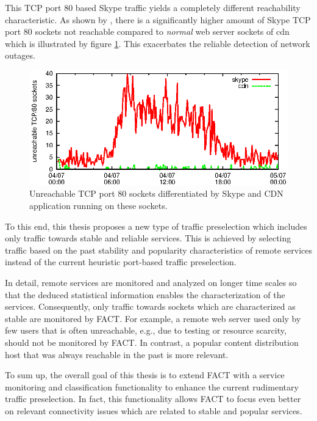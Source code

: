 This \gls{TCP} port 80 based Skype traffic yields a completely different reachability characteristic. As shown by \citet{SchatzmanThesis2012}, there is a significantly higher amount of Skype \gls{TCP} port 80 sockets not reachable compared to \emph{normal} web server sockets of \gls{cdn} which is illustrated by figure \ref{fig:skype_traffic}. This exacerbates the reliable detection of network outages. 

\begin{figure}
	[ht] \centering
	\includegraphics[width=12cm]{images/application_fact.eps}
	\caption{Unreachable TCP port 80 sockets differentiated by Skype and CDN application running on these sockets. \citep{SchatzmanThesis2012}} 
	\label{fig:skype_traffic}
\end{figure}

To this end, this thesis proposes a new type of traffic preselection which includes only traffic towards stable and reliable services. This is achieved by selecting traffic based on the past stability and popularity characteristics of remote services instead of the current heuristic port-based traffic preselection.

In detail, remote services are monitored and analyzed on longer time scales so that the deduced statistical information enables the characterization of the services. Consequently, only traffic towards sockets which are characterized as stable are monitored by \gls{FACT}. For example, a remote web server used only by few users that is often unreachable, e.g., due to testing or resource scarcity, should not be monitored by \gls{FACT}. In contrast, a popular content distribution host that was always reachable in the past is more relevant. 

To sum up, the overall goal of this thesis is to extend \gls{FACT} with a service monitoring and classification functionality to enhance the current rudimentary traffic preselection. In fact, this functionality allows \gls{FACT} to focus even better on relevant connectivity issues which are related to stable and popular services.


